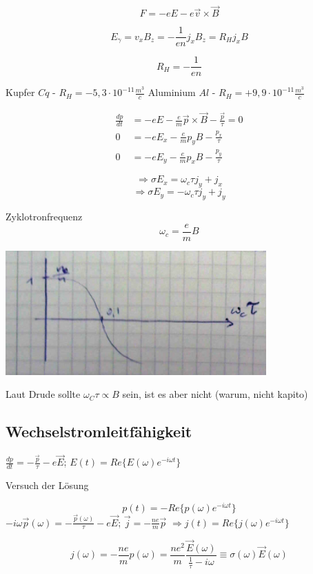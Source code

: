 \[ F = -eE-e\vec v\times \vec B\]

\[E_\gamma = v_xB_z = -\frac{1}{en}j_x B_z = R_H j_xB\]

\[\boxed{R_H=-\frac{1}{en}}\]

Kupfer \(Cq\) - \(R_H=-5,3\cdot 10^{-11}\frac{m^3}{c}\)
Aluminium \(Al\) - \(R_H=+9,9\cdot 10^{-11}\frac{m^3}{c}\)



\begin{align}
\frac{dp}{dt} &= -eE - \frac{e}{m}\vec p \times \vec B - \frac{\vec p}{\tau} = 0\\
0&=-eE_x - \frac{e}{m}p_yB - \frac{p_x}{\tau}\\
0&=-eE_y - \frac{e}{m}p_xB - \frac{p_y}{\tau}
\end{align}

\[ \Rightarrow \sigma E_x = \omega_c \tau j_y + j_x\]
\[ \Rightarrow \sigma E_y = -\omega_c \tau j_y + j_y\]

Zyklotronfrequenz
\[ \omega_c = \frac{e}{m}B \]

\includegraphics[width=0.75\textwidth]{kap06_20.png}

Laut Drude sollte \(\omega_C\tau \propto B\) sein, ist es aber nicht (warum, nicht kapito)

\subsection{Wechselstromleitfähigkeit}

\(\frac{dp}{dt} = -\frac{\vec p}{\tau} - e\vec E\); \(E(t) = Re\{E(\omega)e^{-i\omega t}\}\)

Versuch der Lösung

\[ p(t) = - Re\{p(\omega)e^{-i\omega t}\} \]
\( -i\omega \vec p(\omega) = -\frac{\vec p(\omega)}{\tau}-e\vec E\); \(\vec j = -\frac{ne}{m}\vec p\)
\(\Rightarrow j(t) =  Re\{j(\omega)e^{-i\omega t}\}\)

\[ j(\omega) = -\frac{ne}{m} p(\omega) = \frac{ne^2}{m}\frac{\vec E(\omega)}{\frac{1}{\tau}-i\omega}\equiv\sigma(\omega)\vec E(\omega) \]

